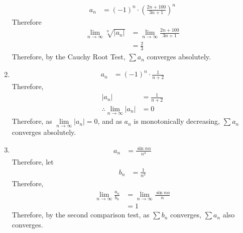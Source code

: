 \documentclass[fleqn, a4paper, 12pt, oneside]{amsart}
\theoremstyle{definition}
\theoremstyle{theorem}
\begin{document}
\begin{solution}
\begin{enumerate}[label=(\alph*), leftmargin=*]
			\begin{align*}
				a_n & = (-1)^n \cdot \left( \frac{2 n + 100}{3 n + 1} \right)^n
			\end{align*}
			Therefore
			\begin{align*}
				\lim\limits_{n \to \infty} \sqrt[n]{|a_n|} & = \lim\limits_{n \to \infty} \frac{2 n + 100}{3 n + 1} \\
                                                                           & = \frac{2}{3}
			\end{align*}
			Therefore, by the Cauchy Root Test, $\sum a_n$ converges absolutely.
		\item
			\begin{align*}
				a_n & = (-1)^n \cdot \frac{1}{n + 2}
			\end{align*}
			Therefore,
			\begin{align*}
				|a_n|                                       & = \frac{1}{n + 2} \\
				\therefore \lim\limits_{n \to \infty} |a_n| & = 0
			\end{align*}
			Therefore, as $\lim\limits_{n \to \infty} |a_n| = 0$, and as $a_n$ is monotonically decreasing, $\sum a_n$ converges absolutely.
		\item
			\begin{align*}
				a_n & = \frac{\sin n \alpha}{n^4}
			\end{align*}
			Therefore, let
			\begin{align*}
				b_n & = \frac{1}{n^3}
			\end{align*}
			Therefore,
			\begin{align*}
				\lim\limits_{n \to \infty} \frac{a_n}{b_n} & = \lim\limits_{n \to \infty} \frac{\sin n \alpha}{n} \\
                                                                           & = 1
			\end{align*}
			Therefore, by the second comparison test, as $\sum b_n$ converges, $\sum a_n$ also converges.
	\end{enumerate}
\end{solution}
\end{document}
